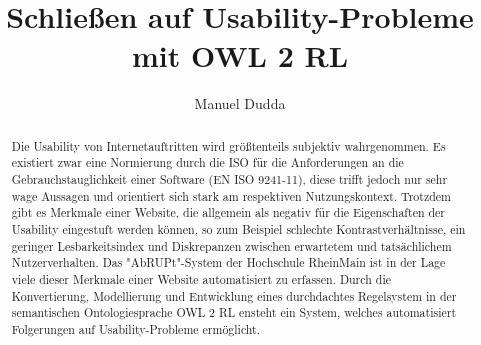 \documentclass[runningheads,a4paper]{llncs}
\begin{document}
\mainmatter  %

\title{Schließen auf Usability-Probleme mit OWL 2 RL}


%
%
\author{Manuel Dudda}
%


%
%

\maketitle


\begin{abstract}
Die Usability von Internetauftritten wird größtenteils subjektiv wahrgenommen. 
Es existiert zwar eine Normierung durch die ISO für die Anforderungen an die Gebrauchstauglichkeit einer Software (EN ISO 9241-11), diese trifft jedoch nur sehr wage Aussagen und orientiert sich stark am respektiven Nutzungskontext. 
Trotzdem gibt es Merkmale einer Website, die allgemein als negativ für die Eigenschaften der Usability eingestuft werden können, so zum Beispiel schlechte Kontrastverhältnisse, ein geringer Lesbarkeitsindex und Diskrepanzen zwischen erwartetem und tatsächlichem Nutzerverhalten. 
Das "AbRUPt"-System der Hochschule RheinMain ist in der Lage viele dieser Merkmale einer Website automatisiert zu erfassen. 
Durch die Konvertierung, Modellierung und Entwicklung eines durchdachtes Regelsystem in der semantischen Ontologiesprache OWL 2 RL ensteht ein System, welches automatisiert Folgerungen auf Usability-Probleme ermöglicht.
\end{abstract}
\end{document}
